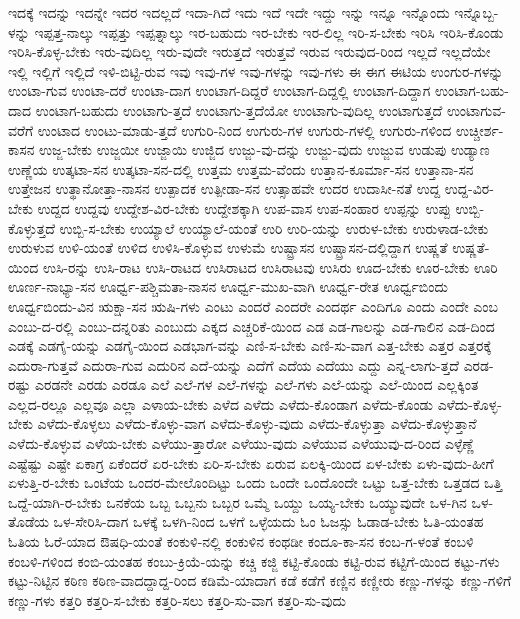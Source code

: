 {ಇದಕ್ಕೆ
ಇದನ್ನು
ಇದನ್ನೇ
ಇದರ
ಇದಲ್ಲದೆ
ಇದಾ-ಗಿದೆ
ಇದು
ಇದೆ
ಇದೇ
ಇದ್ದು
ಇನ್ನು
ಇನ್ನೂ
ಇನ್ನೊಂದು
ಇನ್ನೊಬ್ಬ-ಳನ್ನು
ಇಪ್ಪತ್ತ-ನಾಲ್ಕು
ಇಪ್ಪತ್ತು
ಇಪ್ಪತ್ನಾಲ್ಕು
ಇರ-ಬಹುದು
ಇರ-ಬೇಕು
ಇರ-ಲಿಲ್ಲ
ಇರಿ-ಸ-ಬೇಕು
ಇರಿಸಿ
ಇರಿಸಿ-ಕೊಂಡು
ಇರಿಸಿ-ಕೊಳ್ಳ-ಬೇಕು
ಇರು-ವುದಿಲ್ಲ
ಇರು-ವುದೇ
ಇರುತ್ತದೆ
ಇರುತ್ತವೆ
ಇರುವ
ಇರುವುದ-ರಿಂದ
ಇಲ್ಲದೆ
ಇಲ್ಲದೆಯೇ
ಇಲ್ಲಿ
ಇಲ್ಲಿಗೆ
ಇಲ್ಲಿದೆ
ಇಳಿ-ಬಿಟ್ಟಿ-ರುವ
ಇವು
ಇವು-ಗಳ
ಇವು-ಗಳನ್ನು
ಇವು-ಗಳು
ಈ
ಈಗ
ಈಟಿಯ
ಉಂಗುರ-ಗಳನ್ನು
ಉಂಟಾ-ಗುವ
ಉಂಟಾ-ದರೆ
ಉಂಟಾ-ದಾಗ
ಉಂಟಾಗ-ದಿದ್ದರೆ
ಉಂಟಾಗ-ದಿದ್ದಲ್ಲಿ
ಉಂಟಾಗ-ದಿದ್ದಾಗ
ಉಂಟಾಗ-ಬಹು-ದಾದ
ಉಂಟಾಗ-ಬಹುದು
ಉಂಟಾಗು-ತ್ತದೆ
ಉಂಟಾಗು-ತ್ತದೆಯೋ
ಉಂಟಾಗು-ವುದಿಲ್ಲ
ಉಂಟಾಗುತ್ತದೆ
ಉಂಟಾಗುವ-ವರೆಗೆ
ಉಂಟಾದ
ಉಂಟು-ಮಾಡು-ತ್ತದೆ
ಉಗುರಿ-ನಿಂದ
ಉಗುರು-ಗಳ
ಉಗುರು-ಗಳಲ್ಲಿ
ಉಗುರು-ಗಳಿಂದ
ಉಚ್ಚೀರ್ಶ-ಕಾಸನ
ಉಜ್ಜ-ಬೇಕು
ಉಜ್ಜಯೀ
ಉಜ್ಜಾಯಿ
ಉಜ್ಜಿದ
ಉಜ್ಜು-ವು-ದನ್ನು
ಉಜ್ಜು-ವುದು
ಉಜ್ಜುವ
ಉಡುಪು
ಉಡ್ಯಾಣ
ಉಣ್ಣೆಯ
ಉತ್ಕಟಾ-ಸನ
ಉತ್ಕಟಾ-ಸನ-ದಲ್ಲಿ
ಉತ್ತಮ
ಉತ್ತಮ-ವೆಂದು
ಉತ್ತಾನ-ಕೂರ್ಮಾ-ಸನ
ಉತ್ತಾನಾ-ಸನ
ಉತ್ತೇಜನ
ಉತ್ಥಾನೋತ್ತಾ-ನಾಸನ
ಉತ್ಪಾದಕ
ಉತ್ಪೀಡಾ-ಸನ
ಉತ್ಸಾಹವೇ
ಉದರ
ಉದಾಸೀ-ನತೆ
ಉದ್ದ
ಉದ್ದ-ವಿರ-ಬೇಕು
ಉದ್ದದ
ಉದ್ದವು
ಉದ್ದೇಶ-ವಿರ-ಬೇಕು
ಉದ್ದೇಶಕ್ಕಾಗಿ
ಉಪ-ವಾಸ
ಉಪ-ಸಂಹಾರ
ಉಪ್ಪನ್ನು
ಉಪ್ಪು
ಉಬ್ಬಿ-ಕೊಳ್ಳುತ್ತದೆ
ಉಬ್ಬಿ-ಸ-ಬೇಕು
ಉಯ್ಯಾಲೆ
ಉಯ್ಯಾಲೆ-ಯಂತೆ
ಉರಿ
ಉರಿ-ಯನ್ನು
ಉರುಳ-ಬೇಕು
ಉರುಳಾಡ-ಬೇಕು
ಉರುಳುವ
ಉಳಿ-ಯಂತೆ
ಉಳಿದ
ಉಳಿಸಿ-ಕೊಳ್ಳುವ
ಉಳುಮೆ
ಉಷ್ಟ್ರಾಸನ
ಉಷ್ಟ್ರಾಸನ-ದಲ್ಲಿದ್ದಾಗ
ಉಷ್ಣತೆ
ಉಷ್ಣತೆ-ಯಿಂದ
ಉಸಿ-ರನ್ನು
ಉಸಿ-ರಾಟ
ಉಸಿ-ರಾಟದ
ಉಸಿರಾಟದ
ಉಸಿರಾಟವು
ಉಸಿರು
ಊದ-ಬೇಕು
ಊರ-ಬೇಕು
ಊರಿ
ಊರ್ಣ-ನಾಭ್ಯಾ-ಸನ
ಊರ್ಧ್ವ-ಪಶ್ಚಿಮತಾ-ನಾಸನ
ಊರ್ಧ್ವ-ಮುಖ-ವಾಗಿ
ಊರ್ಧ್ವ-ರೇತ
ಊರ್ಧ್ವಬಿಂದು
ಊರ್ಧ್ವಬಿಂದು-ವಿನ
ಋಕ್ಷಾ-ಸನ
ಋಷಿ-ಗಳು
ಎಂಟು
ಎಂದರೆ
ಎಂದರೇ
ಎಂದರ್ಥ
ಎಂದಿಗೂ
ಎಂದು
ಎಂದೇ
ಎಂಬ
ಎಂಬು-ದ-ರಲ್ಲಿ
ಎಂಬು-ದನ್ನರಿತು
ಎಂಬುದು
ಎಕ್ಕದ
ಎಚ್ಚರಿಕೆ-ಯಿಂದ
ಎಡ
ಎಡ-ಗಾಲನ್ನು
ಎಡ-ಗಾಲಿನ
ಎಡ-ದಿಂದ
ಎಡಕ್ಕೆ
ಎಡಗೈ-ಯನ್ನು
ಎಡಗೈ-ಯಿಂದ
ಎಡಭಾಗ-ವನ್ನು
ಎಣಿ-ಸ-ಬೇಕು
ಎಣಿ-ಸು-ವಾಗ
ಎತ್ತ-ಬೇಕು
ಎತ್ತರ
ಎತ್ತರಕ್ಕೆ
ಎದುರಾ-ಗುತ್ತವೆ
ಎದುರಾ-ಗುವ
ಎದುರಿನ
ಎದೆ-ಯನ್ನು
ಎದೆಗೆ
ಎದೆಯ
ಎದೆಯು
ಎದ್ದು
ಎನ್ನ-ಲಾಗು-ತ್ತದೆ
ಎರಡ-ರಷ್ಟು
ಎರಡನೇ
ಎರಡು
ಎರಡೂ
ಎಲೆ
ಎಲೆ-ಗಳ
ಎಲೆ-ಗಳನ್ನು
ಎಲೆ-ಗಳು
ಎಲೆ-ಯನ್ನು
ಎಲೆ-ಯಿಂದ
ಎಲ್ಲಕ್ಕಿಂತ
ಎಲ್ಲದ-ರಲ್ಲೂ
ಎಲ್ಲವೂ
ಎಲ್ಲಾ
ಎಳಾಯ-ಬೇಕು
ಎಳೆದ
ಎಳೆದು
ಎಳೆದು-ಕೊಂಡಾಗ
ಎಳೆದು-ಕೊಂಡು
ಎಳೆದು-ಕೊಳ್ಳ-ಬೇಕು
ಎಳೆದು-ಕೊಳ್ಳಲು
ಎಳೆದು-ಕೊಳ್ಳು-ವಾಗ
ಎಳೆದು-ಕೊಳ್ಳು-ವುದು
ಎಳೆದು-ಕೊಳ್ಳುತ್ತಾ
ಎಳೆದು-ಕೊಳ್ಳುತ್ತಾನೆ
ಎಳೆದು-ಕೊಳ್ಳುವ
ಎಳೆಯ-ಬೇಕು
ಎಳೆಯು-ತ್ತಾರೋ
ಎಳೆಯು-ವುದು
ಎಳೆಯುವ
ಎಳೆಯುವು-ದ-ರಿಂದ
ಎಳ್ಳೆಣ್ಣೆ
ಎಷ್ಟೆಷ್ಟು
ಎಷ್ಟೇ
ಏಕಾಗ್ರ
ಏಕೆಂದರೆ
ಏರ-ಬೇಕು
ಏರಿ-ಸ-ಬೇಕು
ಏರುವ
ಏಲಕ್ಕಿ-ಯಿಂದ
ಏಳ-ಬೇಕು
ಏಳು-ವುದು-ಹೀಗೆ
ಏಳುತ್ತಿ-ರ-ಬೇಕು
ಒಂಟೆಯ
ಒಂದರ-ಮೇಲೊಂದಿಟ್ಟು
ಒಂದು
ಒಂದೇ
ಒಂದೊಂದೇ
ಒಟ್ಟು
ಒತ್ತ-ಬೇಕು
ಒತ್ತಡದ
ಒತ್ತಿ
ಒದ್ದೆ-ಯಾಗಿ-ರ-ಬೇಕು
ಒನಕೆಯ
ಒಬ್ಬ
ಒಬ್ಬನು
ಒಬ್ಬರ
ಒಮ್ಮೆ
ಒಯ್ದು
ಒಯ್ಯ-ಬೇಕು
ಒಯ್ಯುವುದೇ
ಒಳ-ಗಿನ
ಒಳ-ತೊಡೆಯ
ಒಳ-ಸೇರಿಸಿ-ದಾಗ
ಒಳಕ್ಕೆ
ಒಳಗಿ-ನಿಂದ
ಒಳಗೆ
ಒಳ್ಳೆಯದು
ಓಂ
ಓಜಸ್ಸು
ಓಡಾಡ-ಬೇಕು
ಓತಿ-ಯಂತಹ
ಓತಿಯ
ಓರೆ-ಯಾದ
ಔಷಧಿ-ಯಂತೆ
ಕಂಕುಳಿ-ನಲ್ಲಿ
ಕಂಕುಳಿನ
ಕಂಥಡೀ
ಕಂದೂ-ಕಾ-ಸನ
ಕಂಬ-ಗ-ಳಂತೆ
ಕಂಬಳಿ
ಕಂಬಳಿ-ಗಳಿಂದ
ಕಂಬಿ-ಯಂತಹ
ಕಂಬು-ಕ್ರಿಯೆ-ಯನ್ನು
ಕಚ್ಚಿ
ಕಜ್ಜಿ
ಕಟ್ಟಿ-ಕೊಂಡು
ಕಟ್ಟಿ-ರುವ
ಕಟ್ಟಿಗೆ-ಯಿಂದ
ಕಟ್ಟು-ಗಳು
ಕಟ್ಟು-ನಿಟ್ಟಿನ
ಕಠಿಣ
ಕಠಿಣ-ವಾದದ್ದಾದ್ದ-ರಿಂದ
ಕಡಿಮೆ-ಯಾದಾಗ
ಕಡೆ
ಕಡೆಗೆ
ಕಣ್ಣಿನ
ಕಣ್ಣೀರು
ಕಣ್ಣು-ಗಳನ್ನು
ಕಣ್ಣು-ಗಳಿಗೆ
ಕಣ್ಣು-ಗಳು
ಕತ್ತರಿ
ಕತ್ತರಿ-ಸ-ಬೇಕು
ಕತ್ತರಿ-ಸಲು
ಕತ್ತರಿ-ಸು-ವಾಗ
ಕತ್ತರಿ-ಸು-ವುದು
}
